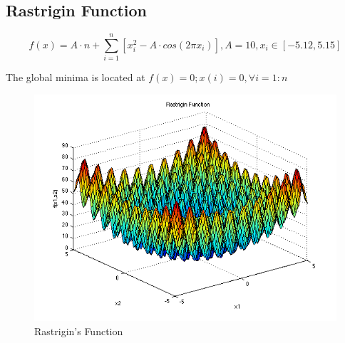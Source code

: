 \documentclass{article}
\begin{document}
\subsection{Rastrigin Function\cite{Rastrigin}}

$$ f(x) = A \cdot n + \sum_{i=1}^n \left[ x_i^2 - A \cdot cos(2 \pi x_i) \right],
A = 10, x_i \in \left[ -5.12, 5.15 \right]$$

The global minima is located at $f(x)=0; x(i)=0,  \forall i=1:n $
\begin{figure}[!h]
  \includegraphics[width=\textwidth,height=\textheight,keepaspectratio]{rastr.png}
  \caption{Rastrigin's Function\cite{rast_img}}
\end{figure}
\end{document}
